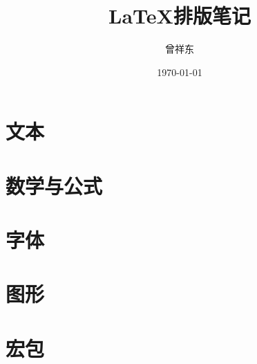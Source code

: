 \documentclass[oneside]{book}
\title{
	\vspace{-4 cm} \color{Sienna} \Huge \LaTeX 排版笔记
}
\author{
	\CJKfamily{楷体} \color{DarkRed} \Large 曾祥东
}
\date{
	\CJKfamily{楷体} \color{Goldenrod} \Large \today
}
\begin{document}
	\frontmatter
	\maketitle
	
	\tableofcontents
	
	\mainmatter
	\chapter{文本}
		
		
	\chapter{数学与公式}
		
		
	\chapter{字体}
	\chapter{图形}
	\chapter{宏包}
		
	
	\backmatter
	{
		\small
		
	}
	\printindex[pkg]
	\printindex[cmd]
\end{document}
